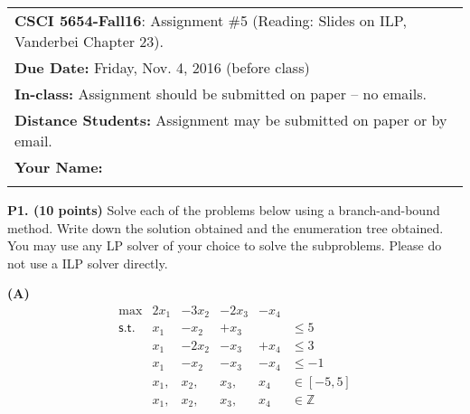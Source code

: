 \documentclass[11pt]{article}
\begin{document}
\begin{tabular}{l}
	\textbf{CSCI 5654-Fall16}: Assignment \#5 (Reading: Slides on ILP, Vanderbei Chapter 23).                                                  \\
	\textbf{Due Date:} Friday, Nov. 4, 2016 (before class)            \\
	\textbf{In-class:} Assignment should be submitted on paper -- no emails. \\
	\textbf{Distance Students:} Assignment may be submitted on paper or
	by email.                                                                \\[10pt]

	\textbf{Your Name:} \phantom{Supercalifragilisticexpialidocius Smith}    \\
	\hline
	                                                                         \\[10pt]
\end{tabular}

\noindent\textbf{P1. (10 points)} Solve each of the problems below using a branch-and-bound method. Write down the solution obtained and the enumeration tree
obtained. You may use any LP solver of your choice to solve the
subproblems. Please do not use a ILP solver directly.

\noindent\textbf{(A)} 
\[\begin{array}{rlllll}
\max & 2 x_1 & - 3 x_2 & -2 x_3 & - x_4 \\
\mathsf{s.t.} & x_1 & - x_2 & + x_3 &   & \leq 5 \\
& x_1 & - 2 x_2 & - x_3 & +x_4   & \leq 3 \\
& x_1 & - x_2 & - x_3 & - x_4 & \leq -1 \\
& x_1, & x_2, & x_3, & x_4 & \in [-5, 5] \\
& x_1, & x_2, & x_3, & x_4 & \in \mathbb{Z} \\
\end{array} \]
\end{document}
